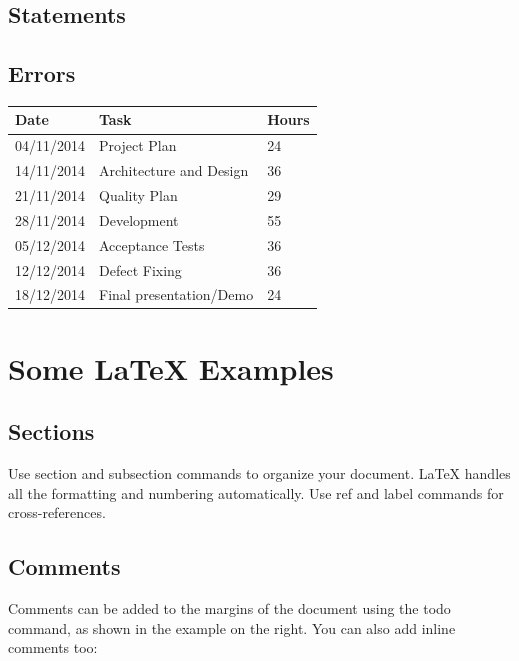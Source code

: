\documentclass[12pt]{article}
\begin{document}
\subsection{Statements}


\subsection{Errors}


\begin{tabularx} {\textwidth} {|X|X|X|} 
 \textbf{Date} & \textbf{Task} & \textbf{Hours} \\ \hline
  04/11/2014 & Project Plan & 24 \\ \hline
  14/11/2014    & Architecture and Design & 36  \\ \hline
  21/11/2014    &  Quality Plan & 29  \\ \hline
  28/11/2014     & Development  &  55 \\ \hline
  05/12/2014      & Acceptance Tests  & 36  \\ \hline
  12/12/2014      & Defect Fixing  &  36 \\ \hline
  18/12/2014          &  Final presentation/Demo  & 24  \\ \hline
\end{tabularx}


\section{Some \LaTeX{} Examples}
\label{sec:examples}

\subsection{Sections}

Use section and subsection commands to organize your document. \LaTeX{} handles all the formatting and numbering automatically. Use ref and label commands for cross-references.

\subsection{Comments}

Comments can be added to the margins of the document using the  todo command, as shown in the example on the right. You can also add inline comments too:

\end{document}

